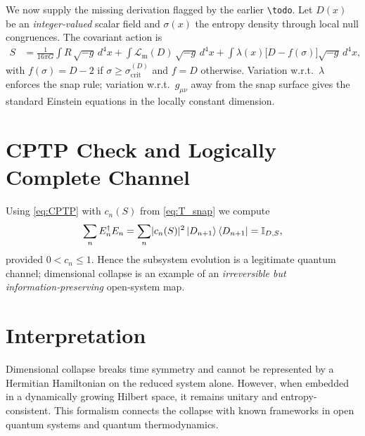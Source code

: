 \documentclass[a4paper, 12pt, oneside]{book}
\numberwithin{equation}{chapter}
\begin{document}
We now supply the missing derivation flagged by the earlier
\texttt{\textbackslash todo}.  Let $D(x)$ be an \textit{integer‑valued}
scalar field and $\sigma(x)$ the entropy density through local
null congruences.  The covariant action is
\begin{align}
  S &= \frac{1}{16\pi G}\int\!R\,\sqrt{-g}\,d^{4}x
       + \int\!\mathcal L_{\mathrm m}(D)\,\sqrt{-g}\,d^{4}x 
       + \int\!\lambda(x)\bigl[D-f(\sigma)\bigr]\sqrt{-g}\,d^{4}x,
       \label{eq:MasterActionFix}
\end{align}
with
\(f(\sigma)=D-2\) if $\sigma\ge\sigma_{\mathrm{crit}}^{(D)}$ and $f=D$
otherwise.  Variation w.r.t.~$\lambda$ enforces the snap rule;
variation w.r.t.~$g_{\mu\nu}$ away from the snap surface gives the
standard Einstein equations in the locally constant dimension.

\section{CPTP Check and Logically Complete Channel}

Using \eqref{eq:CPTP} with $c_n(S)$ from \eqref{eq:T_snap} we compute
\[
    \sum_n E_n^{\dagger}E_n
    = \sum_n \lvert c_n(S)\rvert^{2}\ket{D_{n+1}}\bra{D_{n+1}}
      = \mathbb I_{D,S},
\]
provided $0\!<\!c_n\!\le\!1$.  Hence the subsystem evolution is a
legitimate quantum channel; dimensional collapse is an example of an
\textit{irreversible but information‑preserving} open‑system map.

\section{Interpretation}

Dimensional collapse breaks time symmetry and cannot be represented by a Hermitian Hamiltonian on the reduced system alone. However, when embedded in a dynamically growing Hilbert space, it remains unitary and entropy-consistent. This formalism connects the collapse with known frameworks in open quantum systems and quantum thermodynamics.


\end{document}
